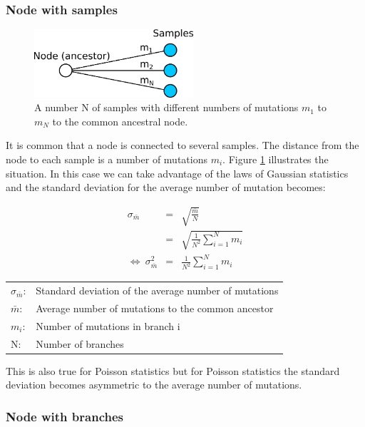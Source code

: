 \subsubsection*{Node with samples}

\begin{figure}[ht]
\centering
\includegraphics[width=5.9cm]{img/node_with_samples.png}
\caption{\label{node_with_samples} A number N of samples with different
numbers of mutations $m_1$ to $m_N$ to the common ancestral node.}
\end{figure}

It is common that a node is connected to several samples.
The distance from the node to each sample is a number of
mutations $m_i$. Figure \ref{node_with_samples} illustrates
the situation. In this case we can take advantage of the laws
of Gaussian statistics and the standard deviation for the
average number of mutation becomes:

\begin{eqnarray}
\sigma_{\bar{m}} & = & \sqrt{\frac{\bar{m}}{N}}\\
                 & = & \sqrt{\frac{1}{N^2} \sum_{i=1}^{N}m_i}\\
\Leftrightarrow\ \sigma_{\bar{m}}^2 & = & \frac{1}{N^2} \sum_{i=1}^{N}m_i
\end{eqnarray}

\begin{tabular}{ll}
$\sigma_{\bar{m}}$: &  Standard deviation of the average number of mutations\\
$\bar{m}$: & Average number of mutations to the common ancestor\\
$m_i$: &  Number of mutations in branch i\\
N: &  Number of branches
\end{tabular}
\vspace{1em}

This is also true for Poisson statistics but for Poisson
statistics the standard deviation becomes asymmetric to
the average number of mutations.


\subsubsection*{Node with branches}


